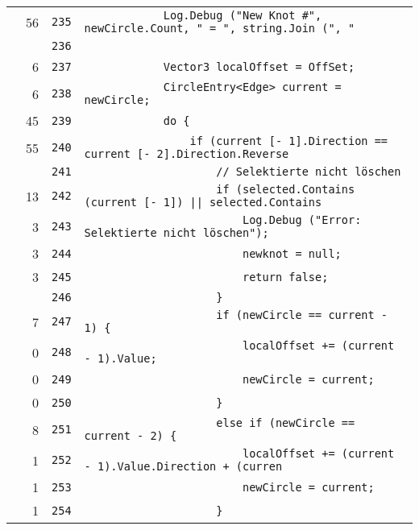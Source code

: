 \documentclass[a4paper,10pt]{article}
\begin{document}
\begin{longtable}[l]{lrrl}
\cellcolor{green} & 56 & \verb~235~ & \verb~            Log.Debug ("New Knot #", newCircle.Count, " = ", string.Join (", "~\\
\cellcolor{gray} &  & \verb~236~ & \verb~~\\
\cellcolor{green} & 6 & \verb~237~ & \verb~            Vector3 localOffset = OffSet;~\\
\cellcolor{green} & 6 & \verb~238~ & \verb~            CircleEntry<Edge> current = newCircle;~\\
\cellcolor{green} & 45 & \verb~239~ & \verb~            do {~\\
\cellcolor{green} & 55 & \verb~240~ & \verb~                if (current [- 1].Direction == current [- 2].Direction.Reverse~\\
\cellcolor{gray} &  & \verb~241~ & \verb~                    // Selektierte nicht löschen~\\
\cellcolor{green} & 13 & \verb~242~ & \verb~                    if (selected.Contains (current [- 1]) || selected.Contains~\\
\cellcolor{green} & 3 & \verb~243~ & \verb~                        Log.Debug ("Error: Selektierte nicht löschen");~\\
\cellcolor{green} & 3 & \verb~244~ & \verb~                        newknot = null;~\\
\cellcolor{green} & 3 & \verb~245~ & \verb~                        return false;~\\
\cellcolor{gray} &  & \verb~246~ & \verb~                    }~\\
\cellcolor{green} & 7 & \verb~247~ & \verb~                    if (newCircle == current - 1) {~\\
\cellcolor{red} & 0 & \verb~248~ & \verb~                        localOffset += (current - 1).Value;~\\
\cellcolor{red} & 0 & \verb~249~ & \verb~                        newCircle = current;~\\
\cellcolor{red} & 0 & \verb~250~ & \verb~                    }~\\
\cellcolor{green} & 8 & \verb~251~ & \verb~                    else if (newCircle == current - 2) {~\\
\cellcolor{green} & 1 & \verb~252~ & \verb~                        localOffset += (current - 1).Value.Direction + (curren~\\
\cellcolor{green} & 1 & \verb~253~ & \verb~                        newCircle = current;~\\
\cellcolor{green} & 1 & \verb~254~ & \verb~                    }~\\

\end{longtable}
\end{document}
